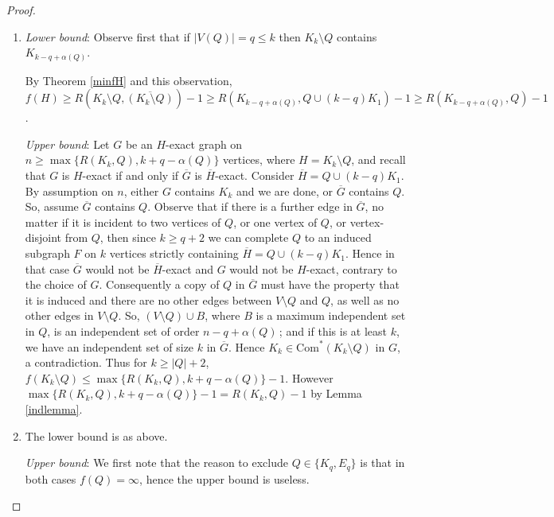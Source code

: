 \documentclass[a4paper,12pt]{article}
\begin{document}
\begin{proof}
$\mbox{ }$
\begin{enumerate}
\item{\textit{Lower bound}:  Observe first that if $|V(Q)| = q \le k$ then $K_k \setminus Q$ contains $K_{k-q+\alpha(Q)}$.
 
By Theorem \ref{minfH} and this observation, $f(H) \ge R(K_k \setminus Q, \overline{(K_k \setminus Q)}) - 1 \ge R(K_{k-q+\alpha(Q)}, Q \cup (k-q)K_1) - 1 \ge R(K_{k-q+\alpha(Q)}, Q) - 1$.

\noindent \textit{Upper bound}:  Let $G$ be an $H$-exact graph on $n \ge \max\{R(K_k, Q), k+q-\alpha(Q)\}$ vertices, where $H = K_k \setminus Q$, and recall that $G$ is $H$-exact if and only if $\overline{G}$ is $\overline{H}$-exact.  
Consider $\overline{H} = Q \cup (k-q)K_1$. By assumption on $n$, either $G$ contains $K_k$ and we are done, or $\overline{G}$ contains $Q$.  
So, assume $\overline{G}$ contains $Q$.
Observe that if there is a further edge in $\overline{G}$, no matter if it is incident to two vertices of $Q$, or one vertex of $Q$, or vertex-disjoint from $Q$, then since $k \ge q + 2$ we can complete $Q$ to an induced subgraph $F$ on $k$ vertices strictly containing $\overline{H} = Q \cup (k-q)K_1$.
Hence in that case $\overline{G}$ would not be $\overline{H}$-exact and $G$ would not be $H$-exact, contrary to the choice of $G$.  
Consequently a copy of $Q$ in $\overline{G}$ must have the property that it is induced and there are no other edges between $V \setminus Q$ and $Q$, as well as no other edges in $V \setminus Q$.
So, $(V \setminus Q) \cup B$, where $B$ is a maximum independent set in $Q$, is an independent set of order $n - q + \alpha(Q)$\,; and if this is at least $k$, we have an independent set of size $k$ in $\overline{G}$. Hence $K_k \in \text{Com}^*(K_k \setminus Q)$ in $G$, a contradiction.
Thus for $k \ge |Q| + 2$, $f(K_k \setminus Q) \le \max\{R(K_k, Q), k+q-\alpha(Q)\} - 1$.  However  $\max\{R(K_k,Q), k+q-\alpha(Q)\}-1 = R(K_k , Q) - 1$ by Lemma \ref{indlemma}.}       
 
\item{The lower bound is as above.

\noindent \textit{Upper bound}:
We first note that the reason to exclude $Q \in \{ K_q , E_q \}$  is that in both cases $f(Q) = \infty$, hence the upper bound is useless.

}
\end{enumerate}
\end{proof}
\end{document}
